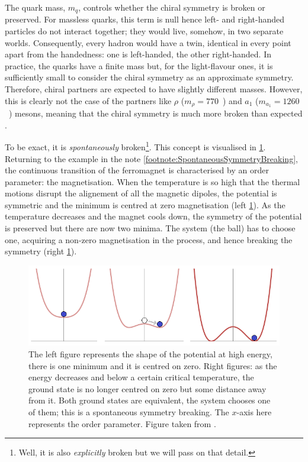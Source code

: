 The quark mass, $m_{q}$, controls whether the chiral symmetry is broken or preserved. For massless quarks, this term is null hence left- and right-handed particles do not interact together; they would live, somehow, in two separate worlds. Consequently, every hadron would have a twin, identical in every point apart from the handedness: one  is left-handed, the other right-handed. In practice, the quarks have a finite mass but, for the light-flavour ones, it is sufficiently small to consider the chiral symmetry as an approximate symmetry. Therefore, chiral partners are expected to have slightly different masses. However, this is clearly not the case of the partners like $\rho$ ($m_{\rho} = 770$~\mmass) and $a_{1}$ ($m_{a_{1}} = 1260 $~\mmass) mesons, meaning that the chiral symmetry is much more broken than expected \cite{kochAspectsChiralSymmetry1997}.

To be exact, it is \textit{spontaneously} broken\footnote{Well, it is also \textit{explicitly} broken but we will pass on that detail.}. This concept is visualised in \fig\ref{fig:ChiralSymmetryBreaking}. Returning to the example in the note \ref{footnote:SpontaneousSymmetryBreaking}, the continuous transition of the ferromagnet is characterised by an order parameter: the magnetisation. When the temperature is so high that the thermal motions disrupt the alignement of all the magnetic dipoles, the potential is symmetric and the minimum is centred at zero magnetisation (left \fig \ref{fig:ChiralSymmetryBreaking}). As the temperature decreases and the magnet cools down, the symmetry of the potential is preserved but there are now two minima. The system (the ball) has to choose one, acquiring a non-zero magnetisation in the process, and hence breaking the symmetry (right \fig \ref{fig:ChiralSymmetryBreaking}).

\begin{figure}[h]
	\centering
	\includegraphics[width=\textwidth]{Figs/Chapter2/Spontaneous_symmetry_breaking_(explanatory_diagram).png}
	\caption{The left figure represents the shape of the potential at high energy, there is one minimum and it is centred on zero. Right figures: as the energy decreases and below a certain critical temperature, the ground state is no longer centred on zero but some distance away from it. Both ground states are equivalent, the system chooses one of them; this is a spontaneous symmetry breaking. The $x$-axis here represents the order parameter. Figure taken from \cite{ft2SpontaneousSymmetryBreaking2012}.}
	\label{fig:ChiralSymmetryBreaking}
\end{figure}

